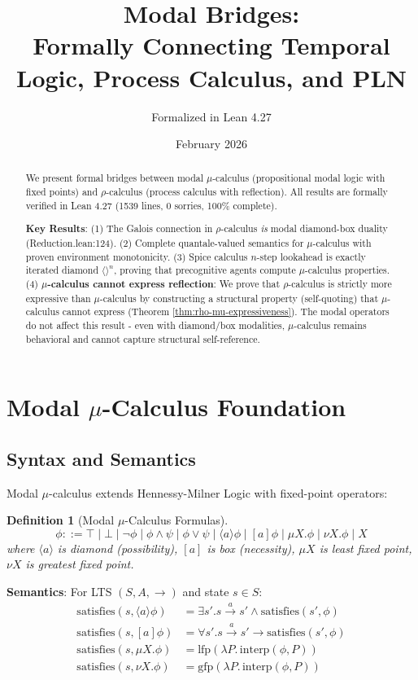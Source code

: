 \documentclass[11pt]{article}
\title{Modal Bridges: \\
\large Formally Connecting Temporal Logic, Process Calculus, and PLN}
\author{Formalized in Lean 4.27}
\date{February 2026}
\newtheorem{definition}[theorem]{Definition}
\begin{document}
\maketitle

\begin{abstract}
We present formal bridges between modal $\mu$-calculus (propositional modal logic with fixed points) and $\rho$-calculus (process calculus with reflection). All results are formally verified in Lean 4.27 (1539 lines, 0 sorries, 100\% complete).

\textbf{Key Results}: (1) The Galois connection in $\rho$-calculus \emph{is} modal diamond-box duality (Reduction.lean:124). (2) Complete quantale-valued semantics for $\mu$-calculus with proven environment monotonicity. (3) Spice calculus $n$-step lookahead is exactly iterated diamond $\langle\rangle^n$, proving that precognitive agents compute $\mu$-calculus properties. (4) \textbf{$\mu$-calculus cannot express reflection}: We prove that $\rho$-calculus is strictly more expressive than $\mu$-calculus by constructing a structural property (self-quoting) that $\mu$-calculus cannot express (Theorem \ref{thm:rho-mu-expressiveness}). The modal operators do not affect this result - even with diamond/box modalities, $\mu$-calculus remains behavioral and cannot capture structural self-reference.
\end{abstract}

\section{Modal $\mu$-Calculus Foundation}

\subsection{Syntax and Semantics}

Modal $\mu$-calculus extends Hennessy-Milner Logic with fixed-point operators:

\begin{definition}[Modal $\mu$-Calculus Formulas]
\[
\phi ::= \top \mid \bot \mid \neg \phi \mid \phi \land \psi \mid \phi \lor \psi \mid \langle a \rangle \phi \mid [a] \phi \mid \mu X.\phi \mid \nu X.\phi \mid X
\]
where $\langle a \rangle$ is diamond (possibility), $[a]$ is box (necessity), $\mu X$ is least fixed point, $\nu X$ is greatest fixed point.
\end{definition}

\textbf{Semantics}: For LTS $(S, A, \to)$ and state $s \in S$:
\begin{align*}
\text{satisfies}(s, \langle a \rangle \phi) &= \exists s'. s \xrightarrow{a} s' \land \text{satisfies}(s', \phi) \\
\text{satisfies}(s, [a] \phi) &= \forall s'. s \xrightarrow{a} s' \to \text{satisfies}(s', \phi) \\
\text{satisfies}(s, \mu X.\phi) &= \text{lfp}(\lambda P.\, \text{interp}(\phi, P)) \\
\text{satisfies}(s, \nu X.\phi) &= \text{gfp}(\lambda P.\, \text{interp}(\phi, P))
\end{align*}
\end{document}
